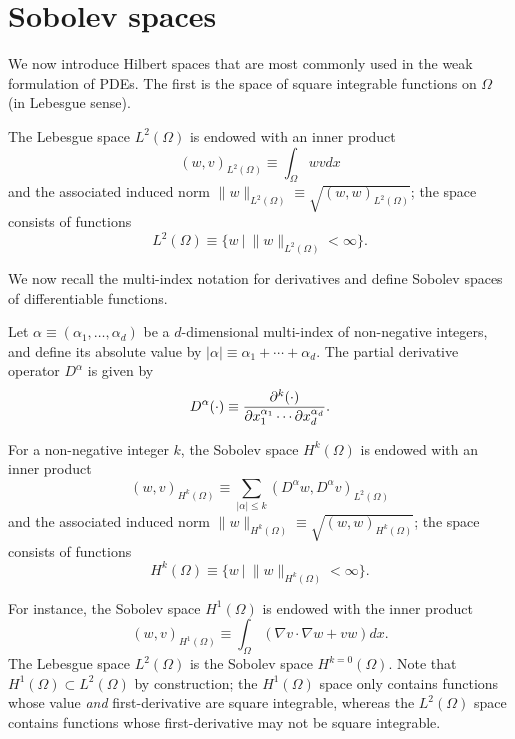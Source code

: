 \section{Sobolev spaces}
We now introduce Hilbert spaces that are most commonly used in the weak formulation of PDEs.  The first is the space of square integrable functions on $\Omega$ (in Lebesgue sense).
\begin{definition}
  The Lebesgue space $L^2(\Omega)$ is endowed with an inner product
  \begin{equation*}
    (w,v)_{L^2(\Omega)} \equiv \int_\Omega w v dx
  \end{equation*}
  and the associated induced norm $\| w \|_{L^2(\Omega)} \equiv \sqrt{(w,w)_{L^2(\Omega)}}$; the space consists of functions
  \begin{equation*}
    L^2(\Omega) \equiv \{ w \ | \ \| w \|_{L^2(\Omega)} < \infty \}.
  \end{equation*}
\end{definition}
We now recall the multi-index notation for derivatives and define Sobolev spaces of differentiable functions.
\begin{definition}
  Let $\alpha \equiv (\alpha_1, \dots, \alpha_d)$ be a $d$-dimensional multi-index of non-negative integers, and define its absolute value by $|\alpha| \equiv \alpha_1 + \cdots + \alpha_d$. The partial derivative operator $D^\alpha$ is given by 
  \begin{equation*}
    D^\alpha (\cdot)  \equiv \frac{\partial ^k (\cdot)}{\partial x_1^{\alpha_1}  \cdots \partial x_d^{\alpha_d}}.
  \end{equation*}
\end{definition}
\begin{definition}
  For a non-negative integer $k$, the Sobolev space $H^k(\Omega)$ is endowed with an inner product
  \begin{equation*}
    (w,v)_{H^k(\Omega)} \equiv \sum_{|\alpha| \leq k} (D^\alpha w, D^\alpha v)_{L^2(\Omega)}
  \end{equation*}
  and the associated induced norm $\| w \|_{H^k(\Omega)} \equiv \sqrt{(w,w)_{H^k(\Omega)}}$; the space consists of functions
  \begin{equation*}
    H^k(\Omega) \equiv \{ w \ | \ \| w \|_{H^k(\Omega)} < \infty \}.
  \end{equation*}
\end{definition}
For instance, the Sobolev space $H^1(\Omega)$ is endowed with the inner product
\begin{equation*}
  (w,v)_{H^1(\Omega)} \equiv \int_\Omega ( \nabla v \cdot \nabla w + v w ) dx.
\end{equation*}
The Lebesgue space $L^2(\Omega)$ is the Sobolev space $H^{k=0}(\Omega)$. Note that $H^1(\Omega) \subset L^2(\Omega)$ by construction; the $H^1(\Omega)$ space only contains functions whose value \emph{and} first-derivative are square integrable, whereas the $L^2(\Omega)$ space contains functions whose first-derivative may not be square integrable.

